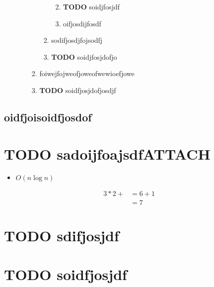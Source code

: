 \documentclass[11pt]{article}
\begin{document}
\begin{enumerate}
\begin{enumerate}
\begin{enumerate}
\begin{enumerate}
\begin{enumerate}

\item {\bfseries\sffamily TODO} soidjfosjdf
\label{sec:orgheadline6}
\item oifjosdijfosdf
\label{sec:orgheadline7}
\end{enumerate}
\item sodifjosdjfojsodfj
\label{sec:orgheadline9}
\item {\bfseries\sffamily TODO} soidjfosjdofjo
\label{sec:orgheadline10}
\end{enumerate}
\item foiwejfojweofjoweofwewioefjowe
\label{sec:orgheadline12}
\item {\bfseries\sffamily TODO} soidfjosjdofjosdjf
\label{sec:orgheadline13}
\end{enumerate}
\end{enumerate}
\end{enumerate}
\subsection{oidfjoisoidfjosdof}
\label{sec:orgheadline18}
\section{{\bfseries\sffamily TODO} sadoijfoajsdf\hfill{}\textsc{ATTACH}}
\label{sec:orgheadline20}
\begin{itemize}
\item \(O(n \log n)\)
\end{itemize}

\begin{align*}
3 * 2 + &= 6 + 1 \\
        &= 7
\end{align*}
\section{{\bfseries\sffamily TODO} sdifjosjdf}
\label{sec:orgheadline21}
\section{{\bfseries\sffamily TODO} soidfjosjdf}
\label{sec:orgheadline22}
\end{document}
